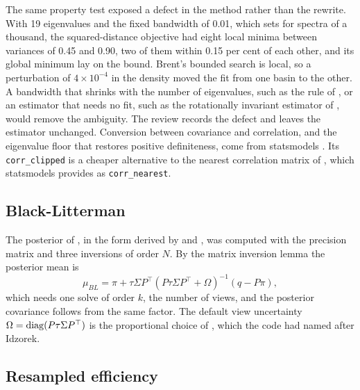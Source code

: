 The same property test exposed a defect in the method rather than the
rewrite. With 19 eigenvalues and the fixed bandwidth of 0.01, which
\citet{lopezdeprado_machine_2020} sets for spectra of a thousand, the
squared-distance objective had eight local minima between variances of 0.45
and 0.90, two of them within 0.15 per cent of each other, and its global
minimum lay on the bound. Brent's bounded search is local, so a perturbation
of $4 \times 10^{-4}$ in the density moved the fit from one basin to the
other. A bandwidth that shrinks with the number of eigenvalues, such as the
rule of \citet{silverman_density_2018}, or an estimator that needs no fit,
such as the rotationally invariant estimator of \citet{bun_cleaning_2017},
would remove the ambiguity. The
review records the defect and leaves the estimator unchanged. Conversion between
covariance and correlation, and the
eigenvalue floor that restores positive definiteness, come from statsmodels
\citep{seabold_statsmodels_2010}. Its \texttt{corr\_clipped} is a cheaper
alternative to the nearest correlation matrix of \citet{higham_computing_2002},
which statsmodels provides as \texttt{corr\_nearest}.

\subsection{Black-Litterman}

The posterior of \citet{black_global_1992}, in the form derived by
\citet{he_intuition_2002} and \citet{walters_blacklitterman_2011}, was
computed with the precision matrix and three inversions of order $N$. By the
matrix inversion lemma \citep{hager_updating_1989} the posterior mean is
\begin{equation}
  \mu_{BL} = \pi + \tau \Sigma P^{\top}
  \left( P \tau \Sigma P^{\top} + \Omega \right)^{-1} (q - P \pi),
\end{equation}
which needs one solve of order $k$, the number of views, and the posterior
covariance follows from the same factor. The default view uncertainty
$\Omega = \operatorname{diag}(P \tau \Sigma P^{\top})$ is the proportional choice of
\citet{he_intuition_2002}, which the code had named after Idzorek.

\subsection{Resampled efficiency}

